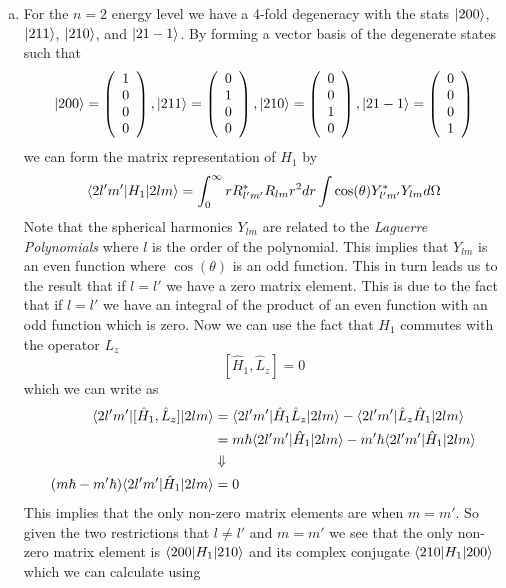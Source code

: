 \documentclass[11pt]{article}
\numberwithin{equation}{section}
\begin{document}
\begin{enumerate}[(a)]
\item
For the $n=2$ energy level we have a 4-fold degeneracy with the stats $|{200}\rangle$, $|{211}\rangle$, $|{210}\rangle$, and $|{21-1}\rangle$. By forming a vector basis of the degenerate states such that
$$|{200}\rangle=\left(\begin{array}{c}1\\0\\0\\0\end{array}\right),
|{211}\rangle=\left(\begin{array}{c}0\\1\\0\\0\end{array}\right),
|{210}\rangle=\left(\begin{array}{c}0\\0\\1\\0\end{array}\right),
|{21-1}\rangle=\left(\begin{array}{c}0\\0\\0\\1\end{array}\right)$$
we can form the matrix representation of $H_1$ by 
$$\langle{2l'm'}|H_1|{2lm}\rangle = \int_{0}^{\infty}rR^{*}_{l'm'}R_{lm}r^2dr\int\cos(\theta)Y_{l'm'}^{*}Y_{lm}d\Omega$$
Note that the spherical harmonics $Y_{lm}$ are related to the \emph{Laguerre Polynomials} where $l$ is the order of the polynomial. This implies that $Y_{lm}$ is an even function where $\cos(\theta)$ is an odd function. This in turn leads us to the result that if $l=l'$ we have a zero matrix element. This is due to the fact that if $l=l'$ we have an integral of the product of an even function with an odd function which is zero. Now we can use the fact that $H_1$ commutes with the operator $L_z$
$$[\hat{H}_1,\hat{L}_z] = 0$$
which we can write as
\begin{align*}
\langle{2l'm'}|[\hat{H}_1,\hat{L}_z]|{2lm}\rangle &= \langle{2l'm'}|\hat{H}_1\hat{L}_z|{2lm}\rangle - \langle{2l'm'}|\hat{L}_z\hat{H}_1|{2lm}\rangle\\
&= m\hbar\langle{2l'm'}|\hat{H}_1|{2lm}\rangle - m'\hbar\langle{2l'm'}|\hat{H}_1|{2lm}\rangle\\
&\Downarrow\\
(m\hbar-m'\hbar)\langle{2l'm'}|\hat{H}_1|{2lm}\rangle &= 0
\end{align*}
This implies that the only non-zero matrix elements are when $m=m'$. So given the two restrictions that $l\ne l'$ and $m=m'$ we see that the only non-zero matrix element is $\langle{200}|H_1|{210}\rangle$ and its complex conjugate $\langle{210}|H_1|{200}\rangle$ which we can calculate using

\end{enumerate}
\end{document}

